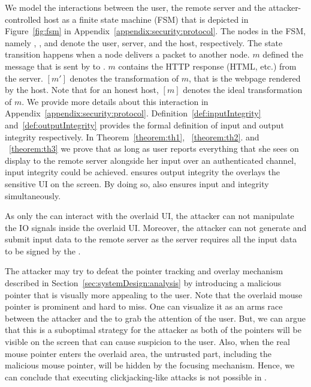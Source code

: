   We model the interactions between the user, the remote server and the attacker-controlled host as a finite state machine (FSM) that is depicted in Figure~\ref{fig:fsm} in Appendix~\ref{appendix:security:protocol}. The nodes in the FSM, namely \user, \server, and \host denote the user, server, and the host, respectively. The state transition happens when a node delivers a packet to another node. $m$ defined the message that is sent by \server to \host. $m$ contains the HTTP response (HTML, \js etc.) from the server. $[m']$ denotes the transformation of $m$, that is the webpage rendered by the host. Note that for an honest host, $[m]$ denotes the ideal transformation of $m$. We provide more details about this interaction in Appendix~\ref{appendix:security:protocol}.
Definition~\ref{def:inputIntegrity} and~\ref{def:outputIntegrity} provides the formal definition of input and output integrity respectively. In Theorem~\ref{theorem:th1}, ~\ref{theorem:th2}. and ~\ref{theorem:th3} we prove that as long as user reports everything that she sees on display to the remote server alongside her input over an authenticated channel, input integrity could be achieved. \name ensures output integrity the \device overlays the sensitive UI on the screen. By doing so, \name also ensures input and integrity simultaneously. 

 As only the \device can interact with the overlaid UI, the attacker can not manipulate the IO signals inside the overlaid UI. Moreover, the attacker can not generate and submit input data to the remote server as the server requires all the input data to be signed by the \device.

The attacker may try to defeat the \name pointer tracking and overlay mechanism described in Section~\ref{sec:systemDesign:analysis} by introducing a malicious pointer that is visually more appealing to the user. Note that the \device overlaid mouse pointer is prominent and hard to miss. One can visualize it as an arms race between the attacker and the \device to grab the attention of the user. But, we can argue that this is a suboptimal strategy for the attacker as both of the pointers will be visible on the screen that can cause suspicion to the user. Also, when the real mouse pointer enters the overlaid area, the untrusted part, including the malicious mouse pointer, will be hidden by the focusing mechanism. Hence, we can conclude that executing clickjacking-like attacks is not possible in \name.

